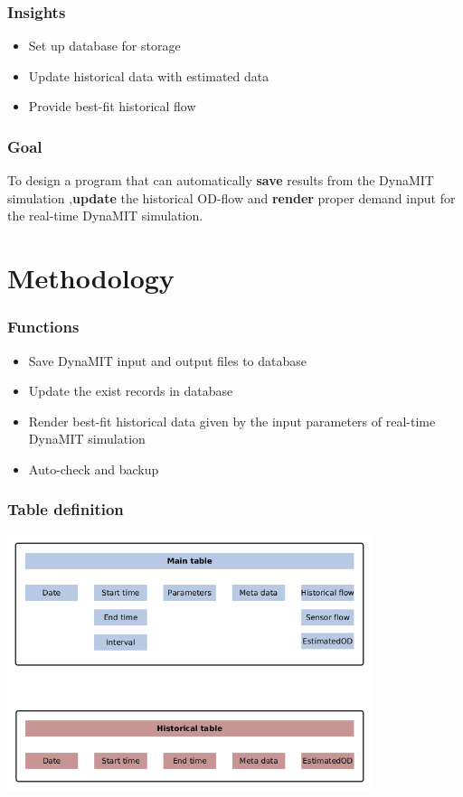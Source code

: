 \documentclass[12pt]{beamer}
\begin{document}
\begin{frame}
\frametitle{Insights}
\begin{itemize}
\item Set up database for storage
\item Update historical data with estimated data
\item Provide best-fit historical flow
\end{itemize}
\end{frame}

\begin{frame}
\frametitle{Goal}
To design a program that can automatically \textbf{save} results from the DynaMIT simulation ,\textbf{update} the historical OD-flow and \textbf{render} proper demand input for the real-time DynaMIT simulation.
\end{frame}


\section{Methodology}
\begin{frame}
\frametitle{Functions}
\begin{itemize}
\item Save DynaMIT input and output files to database
\item Update the exist records in database
\item Render best-fit historical data given by the input parameters of real-time DynaMIT simulation
\item Auto-check and backup
\end{itemize}
\end{frame}


\begin{frame}
\frametitle{Table definition}
\includegraphics[width = 0.8\textwidth]{table.png}
\end{frame}
\end{document}
